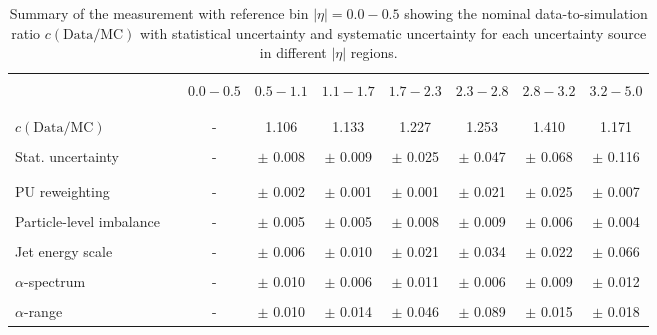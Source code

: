 \begin{table}[!hp]
\centering
\caption{Summary of the measurement with reference bin $|\eta| = 0.0 - 0.5$ showing the nominal data-to-simulation ratio $c\mathrm{(Data/MC)}$ with statistical uncertainty and systematic uncertainty for each uncertainty source in different $|\eta|$ regions.}
\label{tab:syst_uncert_summary_forward_central}
\begin{tabular}{lcccccccc}
\hline
\hline
 & & & & & & & & \\
 & & $0.0 - 0.5$ & $0.5 - 1.1$ & $1.1 - 1.7$ & $1.7 - 2.3$ & $2.3 - 2.8$ & $2.8 - 3.2$ & $3.2-5.0$ \\
 & & & & & & & & \\
\hline
 & & & & & & & & \\
 $c\mathrm{(Data/MC)}$ & & - & 1.106 & 1.133 & 1.227 & 1.253 & 1.410 & 1.171 \\
 & & & & & & & & \\
 Stat. uncertainty & & - & $\pm$ 0.008 & $\pm$ 0.009 & $\pm$ 0.025 & $\pm$ 0.047 & $\pm$ 0.068 & $\pm$ 0.116 \\
 & & & & & & & & \\
\hline
 & & & & & & & & \\
 PU reweighting & & - & $\pm$ 0.002 & $\pm$ 0.001 & $\pm$ 0.001 & $\pm$ 0.021 & $\pm$ 0.025 & $\pm$ 0.007 \\
 & & & & & & & & \\
 Particle-level imbalance & & - & $\pm$ 0.005 & $\pm$ 0.005 & $\pm$ 0.008 & $\pm$ 0.009 & $\pm$ 0.006 & $\pm$ 0.004 \\
 & & & & & & & & \\
 Jet energy scale & & - & $\pm$ 0.006 & $\pm$ 0.010 & $\pm$ 0.021 & $\pm$ 0.034 & $\pm$ 0.022 & $\pm$ 0.066 \\
 & & & & & & & & \\
 $\alpha$-spectrum & & - & $\pm$ 0.010 & $\pm$ 0.006 & $\pm$ 0.011 & $\pm$ 0.006 & $\pm$ 0.009 & $\pm$ 0.012 \\
 & & & & & & & & \\
 $\alpha$-range & & - & $\pm$ 0.010 & $\pm$ 0.014 & $\pm$ 0.046 & $\pm$ 0.089 & $\pm$ 0.015 & $\pm$ 0.018  \\

\end{tabular}
\end{table}
